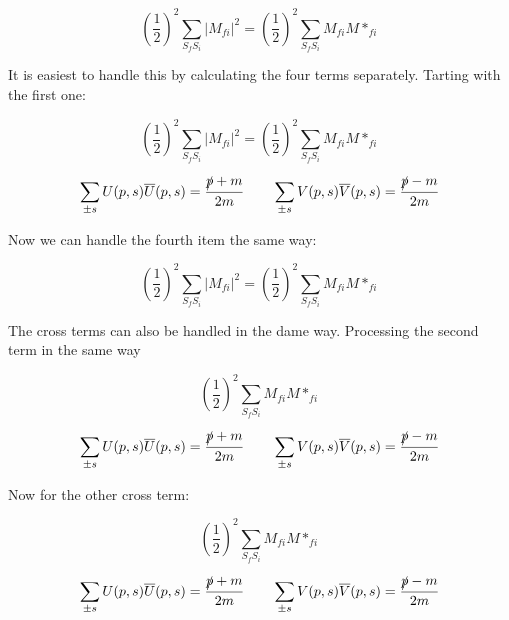 \documentclass[a4]{article}
\begin{document}
    \begin{equation}
        (\frac{1}{2})^2 \sum_{S_f S_i} |M_{f i}|^2 = (\frac{1}{2})^2 \sum_{S_f S_i} M_{fi} M*_{fi}
    \end{equation}

    It is easiest to handle this by calculating the four terms separately. Tarting with the first one:

    \begin{equation}
        (\frac{1}{2})^2 \sum_{S_f S_i} |M_{f i}|^2 = (\frac{1}{2})^2 \sum_{S_f S_i} M_{fi} M*_{fi}
    \end{equation}

    \begin{equation}
        \sum_{\pm s} U (p, s) \overline{U} (p, s) = \frac{\slashed{p} + m}{2m} \qquad \sum_{\pm s} V (p, s) \overline{V} (p, s) = \frac{\slashed{p} - m}{2m}
    \end{equation}

    Now we can handle the fourth item the same way:

    \begin{equation}
        (\frac{1}{2})^2 \sum_{S_f S_i} |M_{f i}|^2 = (\frac{1}{2})^2 \sum_{S_f S_i} M_{fi} M*_{fi}
    \end{equation}

    The cross terms can also be handled in the dame way. Processing the second term in the same way

    \begin{equation}
        (\frac{1}{2})^2 \sum_{S_f S_i} M_{fi} M*_{fi}
    \end{equation}

    \begin{equation}
        \sum_{\pm s} U (p, s) \overline{U} (p, s) = \frac{\slashed{p} + m}{2m} \qquad \sum_{\pm s} V (p, s) \overline{V} (p, s) = \frac{\slashed{p} - m}{2m}
    \end{equation}

    Now for the other cross term:

    \begin{equation}
        (\frac{1}{2})^2 \sum_{S_f S_i} M_{fi} M*_{fi}
    \end{equation}

    \begin{equation}
        \sum_{\pm s} U (p, s) \overline{U} (p, s) = \frac{\slashed{p} + m}{2m} \qquad \sum_{\pm s} V (p, s) \overline{V} (p, s) = \frac{\slashed{p} - m}{2m}
    \end{equation}
\end{document}
